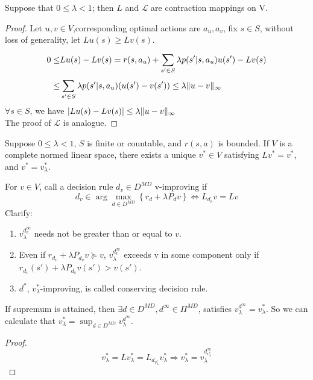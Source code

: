 \begin{lemma}
    Suppose that $ 0 \le \lambda < 1 $; then $ L $ and $ \mathcal{L} $ are contraction mappings on V.
    \begin{proof}
        Let $ u, v \in V $,corresponding optimal actions are $ a_u, a_v $, fix $ s \in S $, without loss of generality, let $ Lu(s) \ge Lv(s) $.
        \begin{align*}
            0 \le& Lu(s) - Lv(s) = r(s, a_u) + \sum^{}_{s' \in S} \lambda p(s'|s, a_u) u(s') - Lv(s)\\
            \le& \sum^{}_{s' \in S} \lambda p(s'|s, a_u) (u(s') - v(s')) \le \lambda \Arrowvert u - v \Arrowvert_\infty\\
        \end{align*}
        $ \forall s \in S $, we have $ \left| Lu(s) - Lv(s) \right| \le \lambda \Arrowvert u - v \Arrowvert_\infty $ \\
        The proof of $ \mathcal{L} $ is analogue.
    \end{proof}
\end{lemma}

\begin{theorem}
    Suppose $ 0 \le \lambda < 1 $, $ S $ is finite or countable, and $ r(s,a) $ is bounded.
    If $ V $ is a complete normed linear space, there exists a unique $ v^* \in V $ satisfying $ Lv^*  = v^* $,
    and $ v^* = v^*_\lambda $.
\end{theorem}

\begin{definition}
    For $ v \in V $, call a decision rule $ d_v \in D^{MD} $ v-improving if
    \[
        d_v \in \arg\max_{d \in D^{MD}} \left\{ r_d + \lambda P_d v \right\} \Leftrightarrow L_{d_v} v = Lv
    \]
    Clarify:
    \begin{enumerate}
        \item $ v^{d^\infty_v}_\lambda $ needs not be greater than or equal to $ v $.
        \item Even if $ r_{d_v} + \lambda P_{d_v} v \succeq v $, $ v^{d^\infty_v}_\lambda $ exceeds  v in some component only if $ r_{d_v} (s') + \lambda P_{d_v} v(s') > v(s') $.
        \item $ d^* $, $ v^*_\lambda $-improving, is called conserving decision rule.
    \end{enumerate}
\end{definition}

\begin{theorem}
    If supremum is attained, then $ \exists d \in D^{MD}, d^\infty \in \Pi^{MD}$, satisfies $v^{d^\infty}_\lambda = v^*_\lambda $.
    So we can calculate that $ v^*_\lambda = \sup_{d \in D^{MD}} v^{d^\infty}_\lambda $.
    \begin{proof}
        \[
            v^*_\lambda = L v^*_\lambda = L_{d_{v^*_\lambda}}v^*_\lambda
            \Rightarrow v^*_\lambda = v^{d^\infty_{v^*_\lambda}}_\lambda
        \]
    \end{proof}
\end{theorem}

